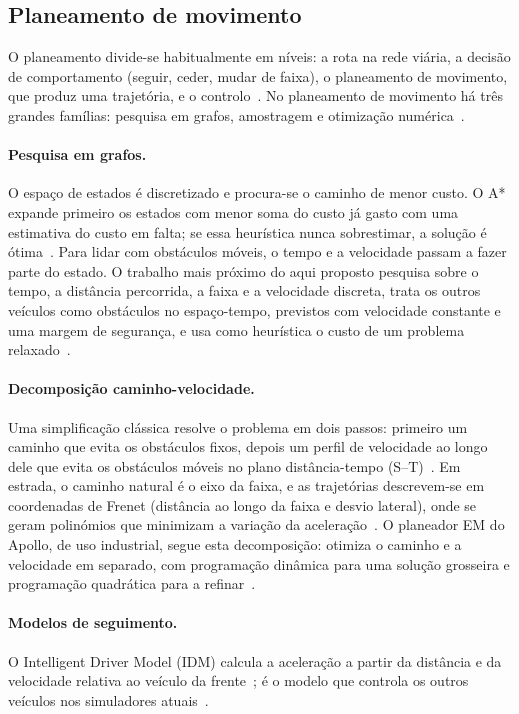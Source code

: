 \subsection{Planeamento de movimento}
\label{sec:planeamento}

O planeamento divide-se habitualmente em níveis: a rota na rede viária, a
decisão de comportamento (seguir, ceder, mudar de faixa), o planeamento de
movimento, que produz uma trajetória, e o
controlo~\cite{paden2016survey}. No planeamento de movimento há três
grandes famílias: pesquisa em grafos, amostragem e otimização
numérica~\cite{paden2016survey}.

\paragraph{Pesquisa em grafos.}
O espaço de estados é discretizado e procura-se o caminho de menor custo.
O A* expande primeiro os estados com menor soma do custo já gasto com uma
estimativa do custo em falta; se essa heurística nunca sobrestimar, a
solução é ótima~\cite{hart1968formal}. Para lidar com obstáculos móveis, o
tempo e a velocidade passam a fazer parte do estado. O trabalho mais
próximo do aqui
proposto pesquisa sobre o tempo, a distância percorrida, a faixa e a
velocidade discreta, trata os outros veículos como obstáculos no
espaço-tempo, previstos com velocidade constante e uma margem de
segurança, e usa como heurística o custo de um problema
relaxado~\cite{ajanovic2018search}.

\paragraph{Decomposição caminho-velocidade.}
Uma simplificação clássica resolve o problema em dois passos: primeiro
um caminho que evita os obstáculos fixos, depois um perfil de velocidade
ao longo dele que evita os obstáculos móveis no plano distância-tempo
(S--T)~\cite{kant1986toward}. Em estrada, o caminho natural é o eixo da
faixa, e as trajetórias descrevem-se em coordenadas de Frenet (distância
ao longo da faixa e desvio lateral), onde se geram polinómios que
minimizam a variação da aceleração~\cite{werling2010optimal}. O planeador
EM do Apollo, de uso industrial, segue esta decomposição: otimiza o
caminho e a velocidade em separado, com programação dinâmica para uma
solução grosseira e programação quadrática para a
refinar~\cite{fan2018baidu}.

\paragraph{Modelos de seguimento.}
O Intelligent Driver Model (IDM) calcula a aceleração a partir da
distância e da velocidade relativa ao veículo da
frente~\cite{treiber2000congested}; é o modelo que controla os outros
veículos nos simuladores
atuais~\cite{karnchanachari2024towards,gulino2023waymax}.

